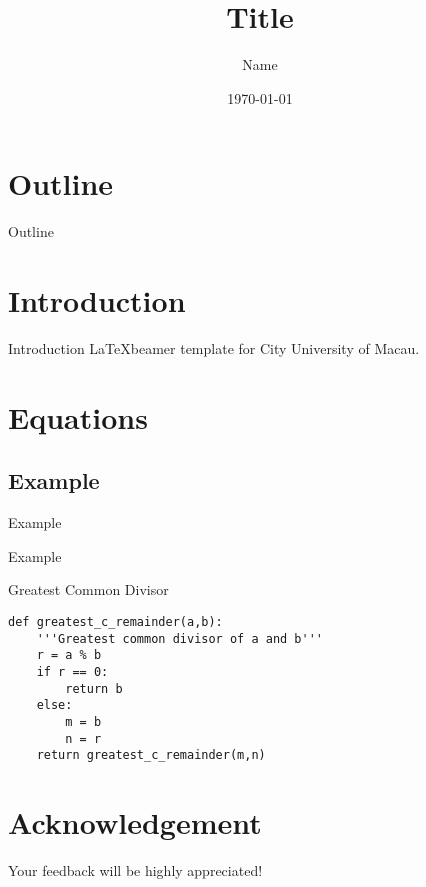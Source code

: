 \documentclass{beamer}
\title{Title }
\author{Name}
\institute{City University of Macau}
\date{\today}
\begin{document}
{ 
\frame{\titlepage}}

\section*{Outline}\begin{frame}{Outline}\tableofcontents\end{frame}

\section{Introduction}
\begin{frame}{Introduction}
  \LaTeX beamer template for City University of Macau.
\end{frame}

\section{Equations}
  
\subsection{Example}
\begin{frame}{Example}
\end{frame}

\begin{frame}[fragile]{Example}
\begin{block}{Greatest Common Divisor}
\begin{lstlisting}[firstnumber=1, label=glabels, xleftmargin=10pt] 
def greatest_c_remainder(a,b):
	'''Greatest common divisor of a and b'''
	r = a % b
	if r == 0:
		return b
	else:
		m = b
		n = r
	return greatest_c_remainder(m,n)

\end{lstlisting}
\end{block}
\end{frame}

\section*{Acknowledgement}  
\begin{frame}
\textcolor{cityugreen}{\large{\centerline{ Your feedback will be highly appreciated!}}}
\end{frame}
\end{document}
